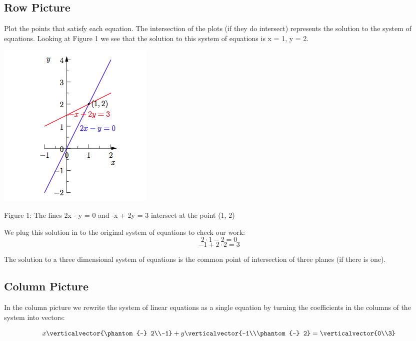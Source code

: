 \documentclass{ximera}
\begin{document}
\subsection*{Row Picture}

\noindent
Plot the points that satisfy each equation. The intersection of the plots (if they do intersect) represents the solution to the system of equations. Looking at Figure 1 we see that the solution to this system of equations is x = 1, y = 2.

\begin{center}
\includegraphics{Geometry1.png}

Figure 1: The lines 2x - y = 0 and -x + 2y = 3 intersect at the point (1, 2)
\end{center}

\noindent
We plug this solution in to the original system of equations to check our work:\\

\[2\cdot1-2 = 0\]
\[-1+2\cdot2 = 3\]

\noindent
The solution to a three dimensional system of equations is the common point of intersection of three planes (if there is one).

\subsection*{Column Picture}

\noindent
In the column picture we rewrite the system of linear equations as a single equation by turning the coefficients in the columns of the system into vectors:\\

\begin{example}
\[x\verticalvector{\phantom{-} 2\\-1} + y\verticalvector{-1\\\phantom{-} 2} = \verticalvector{0\\3}\]\\
\end{example}
\end{document}
